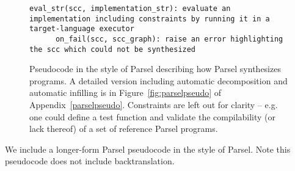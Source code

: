 \begin{figure*}[t]
\begin{lstlisting}[basicstyle=\fontsize{6}{7.5}\selectfont\ttfamily]
      eval_str(scc, implementation_str): evaluate an implementation including constraints by running it in a target-language executor
      on_fail(scc, scc_graph): raise an error highlighting the scc which could not be synthesized
\end{lstlisting}
\vspace{-10px}
\caption{Pseudocode in the style of Parsel describing how Parsel synthesizes programs. A detailed version including automatic decomposition and automatic infilling is in Figure~\ref{fig:parselpseudo} of Appendix~\ref{parselpseudo}. Constraints are left out for clarity -- e.g. one could define a test function and validate the compilability (or lack thereof) of a set of reference Parsel programs.}
\label{shortpseudo}
\vspace{-10px}
\end{figure*}


\label{parselpseudo}
We include a longer-form Parsel pseudocode in the style of Parsel. Note this pseudocode does not include backtranslation.

